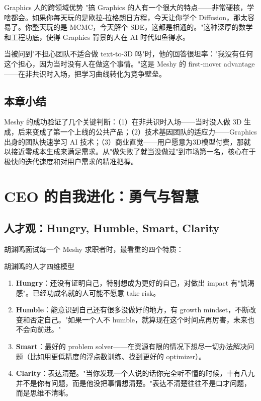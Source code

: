 \documentclass[a4paper]{article}
\begin{document}
\begin{knowledgebox}{Graphics 人的跨领域优势}
"搞 Graphics 的人有一个很大的特点——非常硬核，学啥都会。如果你每天玩的是欧拉-拉格朗日方程，今天让你学个 Diffusion，那太容易了。你整天玩的是 MCMC，今天解个 SDE，这都是相通的。"这种深厚的数学和工程功底，使得 Graphics 背景的人在 AI 时代如鱼得水。
\end{knowledgebox}

当被问到"不担心团队不适合做 text-to-3D 吗"时，他的回答很坦率："我没有任何这个担心，因为当时没有人在做这个事情。"这是 Meshy 的 first-mover advantage——在非共识时入场，把学习曲线转化为竞争壁垒。

\subsection{本章小结}

Meshy 的成功验证了几个关键判断：（1）在非共识时入场——当时没人做 3D 生成，后来变成了第一个上线的公共产品；（2）技术基因团队的适应力——Graphics 出身的团队快速学习 AI 技术；（3）商业直觉——用户愿意为3D模型付费，那就以接近零成本生成来满足需求。从"做失败了就当没做过"到市场第一名，核心在于极快的迭代速度和对用户需求的精准把握。

\section{CEO 的自我进化：勇气与智慧}

\subsection{人才观：Hungry, Humble, Smart, Clarity}

胡渊鸣面试每一个 Meshy 求职者时，最看重的四个特质：

\begin{importantbox}{胡渊鸣的人才四维模型}
\begin{enumerate}
\item \textbf{Hungry}：还没有证明自己，特别想成为更好的自己，对做出 impact 有"饥渴感"。已经功成名就的人可能不愿意 take risk。
\item \textbf{Humble}：能意识到自己还有很多没做好的地方，有 growth mindset，不断改变和否定自己。"如果一个人不 humble，就算现在这个时间点再厉害，未来也不会向前进。"
\item \textbf{Smart}：最好的 problem solver——在资源有限的情况下想尽一切办法解决问题（比如用更低精度的浮点数训练、找到更好的 optimizer）。
\item \textbf{Clarity}：表达清楚。"当你发现一个人说的话你完全听不懂的时候，十有八九并不是你有问题，而是他没把事情想清楚。"表达不清楚往往不是口才问题，而是思维不清晰。
\end{enumerate}
\end{importantbox}
\end{document}
